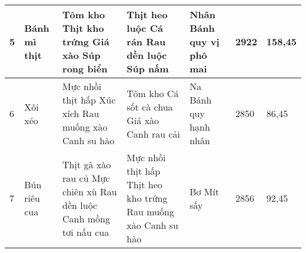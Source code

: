\begin{center}
\begin{tabular}{ | m{0.8cm} | m{2cm}| m{3cm} |m{3cm} | m{3.2cm} | m{2.2cm} |m{1cm} |}
 \hline
  5 & Bánh mì thịt & Tôm kho \newline Thịt kho trứng \newline Giá xào \newline Súp rong biển & Thịt heo luộc \newline Cá rán \newline Rau dền luộc \newline Súp nấm & Nhãn \newline Bánh quy vị phô mai & 2922 & 158,45 \\ 
 \hline
  6 & Xôi xéo & Mực nhồi thịt hấp \newline Xúc xích \newline Rau muống xào \newline Canh su hào  &Tôm kho \newline Cá sốt cà chua \newline Giá xào \newline Canh rau cải  & Na \newline  Bánh quy hạnh nhân & 2850 & 86,45 \\ 
 \hline
  7 & Bún riêu cua  & Thịt gà xào rau củ \newline Mực chiên xù \newline Rau dền luộc \newline Canh mồng tơi nấu cua & Mực nhồi thịt hấp \newline Thịt heo kho trứng \newline Rau muống xào \newline Canh su hào & Bơ \newline Mít sấy & 2856 & 92,45 \\ 
 \hline
\end{tabular}
\end{center}
